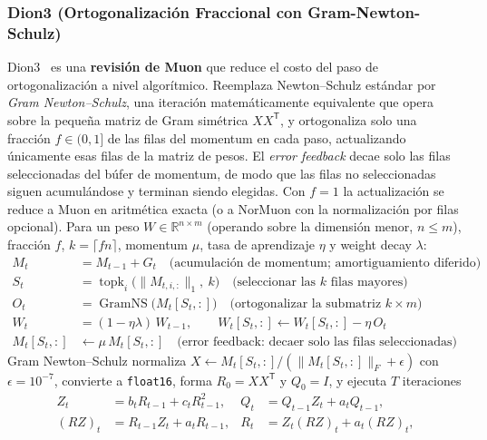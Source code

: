 \subsubsection{Dion3 (Ortogonalización Fraccional con Gram-Newton-Schulz)}
Dion3~\citep{amsel_dion3_2026} es una \textbf{revisión de Muon} que reduce el costo del paso de ortogonalización a nivel algorítmico. Reemplaza Newton--Schulz estándar por \emph{Gram Newton--Schulz}, una iteración matemáticamente equivalente que opera sobre la pequeña matriz de Gram simétrica $XX^{\mathsf T}$, y ortogonaliza solo una fracción $f \in (0,1]$ de las filas del momentum en cada paso, actualizando únicamente esas filas de la matriz de pesos. El \emph{error feedback} decae solo las filas seleccionadas del búfer de momentum, de modo que las filas no seleccionadas siguen acumulándose y terminan siendo elegidas. Con $f = 1$ la actualización se reduce a Muon en aritmética exacta (o a NorMuon con la normalización por filas opcional). Para un peso $W \in \mathbb{R}^{n \times m}$ (operando sobre la dimensión menor, $n \le m$), fracción $f$, $k = \lceil f n \rceil$, momentum $\mu$, tasa de aprendizaje $\eta$ y weight decay $\lambda$:
\begin{align}
M_t &= M_{t-1} + G_t \quad\text{(acumulación de momentum; amortiguamiento diferido)} \\
S_t &= \operatorname{topk}_{i}\bigl(\lVert M_{t,i,:}\rVert_1,\ k\bigr) \quad\text{(seleccionar las } k \text{ filas mayores)} \\
O_t &= \operatorname{GramNS}\bigl(M_t[S_t,:]\bigr) \quad\text{(ortogonalizar la submatriz } k \times m\text{)} \\
W_t &= (1 - \eta\lambda)\, W_{t-1}, \qquad W_t[S_t,:] \gets W_t[S_t,:] - \eta\, O_t \\
M_t[S_t,:] &\gets \mu\, M_t[S_t,:] \quad\text{(error feedback: decaer solo las filas seleccionadas)}
\end{align}
Gram Newton--Schulz normaliza $X \gets M_t[S_t,:]/(\lVert M_t[S_t,:]\rVert_F + \epsilon)$ con $\epsilon = 10^{-7}$, convierte a \texttt{float16}, forma $R_0 = X X^{\mathsf T}$ y $Q_0 = I$, y ejecuta $T$ iteraciones
\begin{align}
Z_t &= b_t R_{t-1} + c_t R_{t-1}^2, &
Q_t &= Q_{t-1} Z_t + a_t Q_{t-1}, \\
(RZ)_t &= R_{t-1} Z_t + a_t R_{t-1}, &
R_t &= Z_t (RZ)_t + a_t (RZ)_t,
\end{align}
